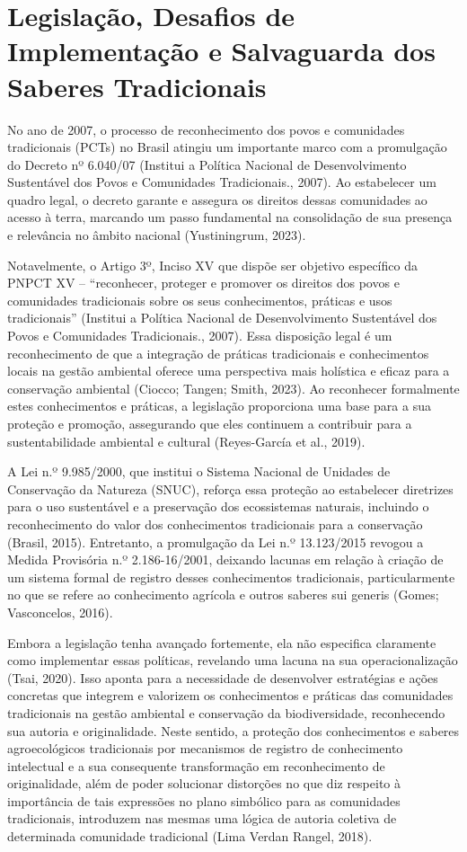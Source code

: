 \section{Legislação, Desafios de Implementação e Salvaguarda dos Saberes Tradicionais}


No ano de 2007, o processo de reconhecimento dos povos e comunidades tradicionais (PCTs) no Brasil atingiu um importante marco com a promulgação do Decreto nº 6.040/07 (Institui a Política Nacional de Desenvolvimento Sustentável dos Povos e Comunidades Tradicionais., 2007). Ao estabelecer um quadro legal, o decreto garante e assegura os direitos dessas comunidades ao acesso à terra, marcando um passo fundamental na consolidação de sua presença e relevância no âmbito nacional (Yustiningrum, 2023).

Notavelmente, o Artigo 3º, Inciso XV que dispõe ser objetivo específico da PNPCT XV – “reconhecer, proteger e promover os direitos dos povos e comunidades tradicionais sobre os seus conhecimentos, práticas e usos tradicionais” (Institui a Política Nacional de Desenvolvimento Sustentável dos Povos e Comunidades Tradicionais., 2007). Essa disposição legal é um reconhecimento de que a integração de práticas tradicionais e conhecimentos locais na gestão ambiental oferece uma perspectiva mais holística e eficaz para a conservação ambiental (Ciocco; Tangen; Smith, 2023). Ao reconhecer formalmente estes conhecimentos e práticas, a legislação proporciona uma base para a sua proteção e promoção, assegurando que eles continuem a contribuir para a sustentabilidade ambiental e cultural (Reyes-García et al., 2019). 

A Lei n.º 9.985/2000, que institui o Sistema Nacional de Unidades de Conservação da Natureza (SNUC), reforça essa proteção ao estabelecer diretrizes para o uso sustentável e a preservação dos ecossistemas naturais, incluindo o reconhecimento do valor dos conhecimentos tradicionais para a conservação (Brasil, 2015). Entretanto, a promulgação da Lei n.º 13.123/2015 revogou a Medida Provisória n.º 2.186-16/2001, deixando lacunas em relação à criação de um sistema formal de registro desses conhecimentos tradicionais, particularmente no que se refere ao conhecimento agrícola e outros saberes sui generis (Gomes; Vasconcelos, 2016). 

Embora a legislação tenha avançado fortemente, ela não especifica claramente como implementar essas políticas, revelando uma lacuna na sua operacionalização (Tsai, 2020). Isso aponta para a necessidade de desenvolver estratégias e ações concretas que integrem e valorizem os conhecimentos e práticas das comunidades tradicionais na gestão ambiental e conservação da biodiversidade, reconhecendo sua autoria e originalidade.
Neste sentido, a proteção dos conhecimentos e saberes agroecológicos tradicionais por mecanismos de registro de conhecimento intelectual e a sua consequente transformação em reconhecimento de originalidade, além de poder solucionar distorções no que diz respeito à importância de tais expressões no plano simbólico para as comunidades tradicionais, introduzem nas mesmas uma lógica de autoria coletiva de determinada comunidade tradicional (Lima Verdan Rangel, 2018).

